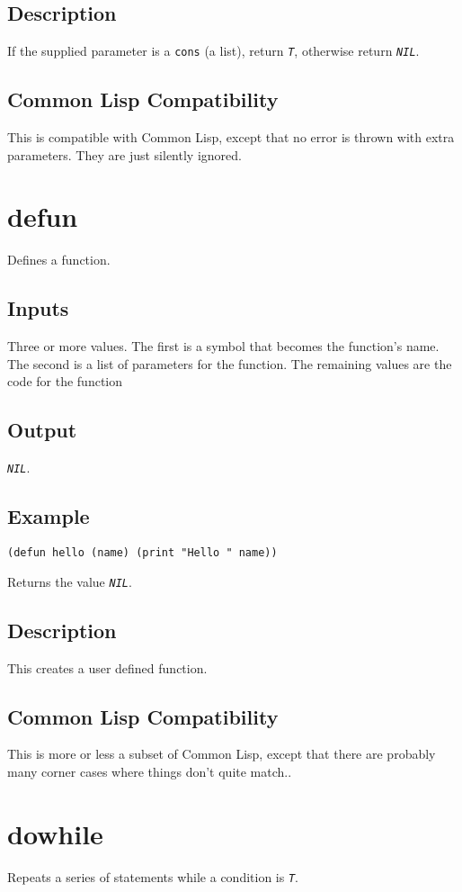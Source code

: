\documentclass[10pt, openany]{book}
\newcommand{\constant}[1]{\emph{\texttt{#1}}}
\newcommand{\datatype}[1]{\texttt{#1}}
\newcommand{\cl}{Common Lisp}
\begin{document}
\subsection{Description}
If the supplied parameter is a \datatype{cons} (a list), return \constant{T}, otherwise return \constant{NIL}.
\subsection{Common Lisp Compatibility}
This is compatible with \cl, except that no error is thrown with extra parameters.  They are just silently ignored.

\section{defun}
Defines a function.
\subsection{Inputs}
Three or more values.  The first is a symbol that becomes the function's name.  The second is a list of parameters for the function.  The remaining values are the code for the function
\subsection{Output}
\constant{NIL}.
\subsection{Example}
\begin{lstlisting}
(defun hello (name) (print "Hello " name))
\end{lstlisting}
Returns the value \constant{NIL}.
\subsection{Description}
This creates a user defined function.
\subsection{Common Lisp Compatibility}
This is more or less a subset of \cl, except that there are probably many corner cases where things don't quite match..

\section{dowhile}
Repeats a series of statements while a condition is \constant{T}.
\end{document}
